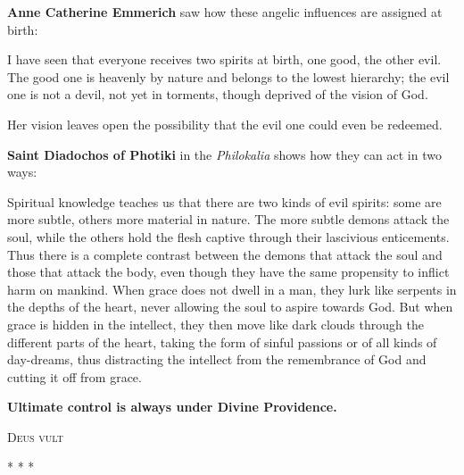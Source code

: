 \textbf{Anne Catherine Emmerich} saw how these angelic influences are assigned at birth:

\begin{quotex}
I have seen that everyone receives two spirits at birth, one good, the other evil. The good one is heavenly by nature
and belongs to the lowest hierarchy; the evil one is not a devil, not yet in torments, though deprived of the vision of
God. 

\end{quotex}
Her vision leaves open the possibility that the evil one could even be redeemed.

\textbf{Saint Diadochos of Photiki} in the \emph{Philokalia} shows how they can act in two ways:

\begin{quotationx}
Spiritual knowledge teaches us that there are two kinds of evil spirits: some are more subtle, others more material in
nature. The more subtle demons attack the soul, while the others hold the flesh captive through their lascivious
enticements. Thus there is a complete contrast between the demons that attack the soul and those that attack the body,
even though they have the same propensity to inflict harm on mankind. When grace does not dwell in a man, they lurk
like serpents in the depths of the heart, never allowing the soul to aspire towards God. But when grace is hidden in
the intellect, they then move like dark clouds through the different parts of the heart, taking the form of sinful
passions or of all kinds of day-dreams, thus distracting the intellect from the remembrance of God and cutting it off
from grace. 

\end{quotationx}
\textbf{Ultimate control is always under Divine Providence.}

\begin{center}\scshape Deus vult\end{center}


\begin{center}* * *\end{center}

